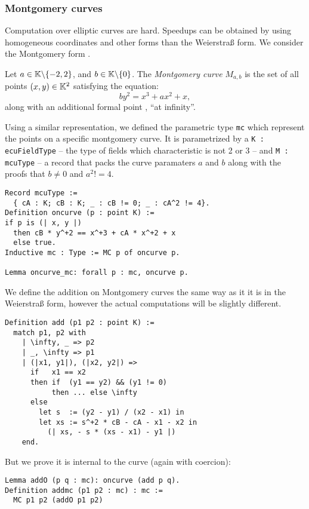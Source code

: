 \subsubsection{Montgomery curves}
\label{montgomery}
Computation over elliptic curves are hard. Speedups can be obtained by using
homogeneous coordinates and other forms than the Weierstra{\ss} form. We consider
the Montgomery form \cite{MontgomerySpeeding}.

\begin{definition}
  Let $a \in \mathbb{K} \backslash \{-2, 2\}$, and $b \in \mathbb{K} \backslash \{ 0\}$. The \textit{Montgomery curve} $M_{a,b}$ is the set of all points $(x,y) \in \mathbb{K}^2$ satisfying the equation:
  $$by^2 = x^3 + ax^2 + x,$$
  along with an additional formal point \Oinf, ``at infinity''.
\end{definition}

Using a similar representation, we defined the parametric type \texttt{mc} which
represent the points on a specific montgomery curve. It is parametrized by
a \texttt{K : ecuFieldType} -- the type of fields which characteristic is not 2 or 3 --
and \texttt{M : mcuType} -- a record that packs the curve paramaters $a$ and $b$
along with the proofs that $b \neq 0$ and $a^2 != 4$.
\begin{lstlisting}[language=Coq]
Record mcuType :=
  { cA : K; cB : K; _ : cB != 0; _ : cA^2 != 4}.
Definition oncurve (p : point K) :=
if p is (| x, y |)
  then cB * y^+2 == x^+3 + cA * x^+2 + x
  else true.
Inductive mc : Type := MC p of oncurve p.

Lemma oncurve_mc: forall p : mc, oncurve p.
\end{lstlisting}

We define the addition on Montgomery curves the same way as it it is in the Weierstra{\ss} form,
however the actual computations will be slightly different.
\begin{lstlisting}[language=Coq]
Definition add (p1 p2 : point K) :=
  match p1, p2 with
    | \infty, _ => p2
    | _, \infty => p1
    | (|x1, y1|), (|x2, y2|) =>
      if   x1 == x2
      then if  (y1 == y2) && (y1 != 0)
           then ... else \infty
      else
        let s  := (y2 - y1) / (x2 - x1) in
        let xs := s^+2 * cB - cA - x1 - x2 in
          (| xs, - s * (xs - x1) - y1 |)
    end.
\end{lstlisting}

But we prove it is internal to the curve (again with coercion):
\begin{lstlisting}[language=Coq]
Lemma addO (p q : mc): oncurve (add p q).
Definition addmc (p1 p2 : mc) : mc :=
  MC p1 p2 (addO p1 p2)
\end{lstlisting}

